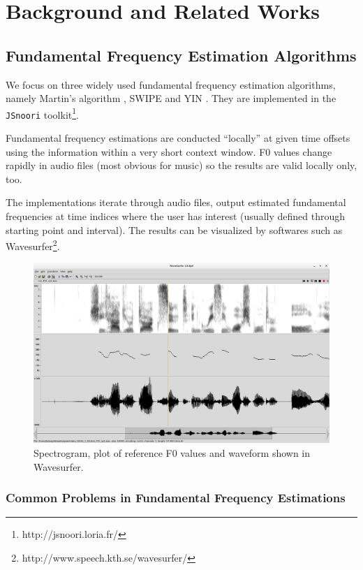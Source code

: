 \documentclass[11pt,a4paper,titlepage]{article}
\begin{document}
\newpage

\section{Background and Related Works}

\subsection{Fundamental Frequency Estimation Algorithms}
We focus on three widely used fundamental frequency estimation algorithms, namely Martin's algorithm \cite{martin1982comparison}, SWIPE \cite{camacho2007swipe} and YIN \cite{de2002yin}.
They are implemented in the \texttt{JSnoori} toolkit\footnote{http://jsnoori.loria.fr/}.

Fundamental frequency estimations are conducted \enquote{locally} at given time offsets using the information within a very short context window.
F0 values change rapidly in audio files (most obvious for music) so the results are valid locally only, too.

The implementations iterate through audio files, output estimated fundamental frequencies at time indices where the user has interest (usually defined through starting point and interval).
The results can be visualized by softwares such as Wavesurfer\footnote{http://www.speech.kth.se/wavesurfer/}\cite{sjolander2000wavesurfer}.

\begin{figure}[htbp]
  \centering
  \includegraphics[width=\textwidth]{wavesurfer.png}
  \caption{Spectrogram, plot of reference F0 values and waveform shown in Wavesurfer.} \label{fig:wavesurfer}
\end{figure}

\subsubsection{Common Problems in Fundamental Frequency Estimations}
\end{document}
